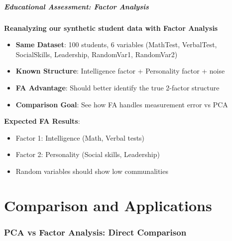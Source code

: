 \documentclass[aspectratio=169]{beamer}
\begin{document}
\begin{frame}
    \frametitle{Educational Assessment: Factor Analysis}
    \textbf{Reanalyzing our synthetic student data with Factor Analysis}
    \begin{itemize}
        \item \textbf{Same Dataset}: 100 students, 6 variables (MathTest, VerbalTest, SocialSkills, Leadership, RandomVar1, RandomVar2) \pause
        \item \textbf{Known Structure}: Intelligence factor + Personality factor + noise \pause
        \item \textbf{FA Advantage}: Should better identify the true 2-factor structure \pause
        \item \textbf{Comparison Goal}: See how FA handles measurement error vs PCA
    \end{itemize}
    \vspace{12pt}
    \textbf{Expected FA Results}:
    \begin{itemize}
        \item Factor 1: Intelligence (Math, Verbal tests) \pause
        \item Factor 2: Personality (Social skills, Leadership) \pause
        \item Random variables should show low communalities \pause
    \end{itemize}
\end{frame}



\part{Comparison and Applications}

\begin{frame}
    \partpage
\end{frame}

\section{PCA vs Factor Analysis: Direct Comparison}
\end{document}
